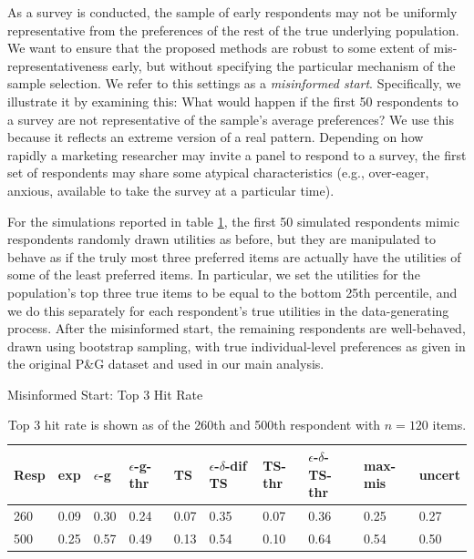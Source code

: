 \documentclass[nonblindrev]{informs3}
\newcommand{\fixedexpressS}{\textbf{exp}}
\newcommand{\egreedyS}{$\epsilon$-\textbf{g}}
\newcommand{\egreedythresS}{$\epsilon$-\textbf{g-thr}}
\newcommand{\misminS}{\textbf{max-mis}}
\newcommand{\tsS}{\textbf{TS} }
\newcommand{\edtsS}{$\epsilon$-$\delta$-\textbf{dif TS} }
\newcommand{\tsthresS}{\textbf{TS-thr} }
\newcommand{\edtsthresS}{$\epsilon$-$\delta$-\textbf{TS-thr} }
\newcommand{\uncertS}{\textbf{uncert} }
\newcommand{\numitems}{n}
\begin{document}
As a survey is conducted, the sample of early respondents may not be uniformly representative from the preferences of the rest of the true underlying population. We want to ensure that the proposed methods are robust to some extent of mis-representativeness early, but without specifying the particular mechanism of the sample selection. We refer to this settings as a \emph{misinformed start}. Specifically, we illustrate it by examining this: What would happen if the first 50 respondents to a survey are not representative of the sample's average preferences? We use this because it reflects an extreme version of a real pattern. Depending on how rapidly a marketing researcher may invite a panel to respond to a survey, the first set of respondents may share some atypical characteristics (e.g., over-eager, anxious, available to take the survey at a particular time).

For the simulations reported in table \ref{table:120mis}, the first 50 simulated respondents mimic respondents randomly drawn utilities as before, but they are manipulated to behave as if the truly most three preferred items are actually have the utilities of some of the least preferred items. In particular, we set the utilities for the population's top three true items to be equal to the bottom 25th percentile, and we do this separately for each respondent's true utilities in the data-generating process. After the misinformed start, the remaining respondents are well-behaved, drawn using bootstrap sampling, with true individual-level preferences as given in the original P\&G dataset and used in our main analysis.

\begin{table}
\caption{Misinformed Start: Top 3 Hit Rate}
\begin{tabular}{llllllllll}
\hline   Resp &  \fixedexpressS&\egreedyS&\egreedythresS&\tsS&\edtsS&\tsthresS&\edtsthresS& \misminS& \uncertS   \\ \hline    260 &   0.09 &   0.30 & 0.24 & 0.07  & 0.35 & 0.07 &  0.36 & 0.25 &   0.27 \\
  500 &  0.25 &   0.57 &  0.49 &  0.13 & 0.54 &   0.10 &    0.64 & 0.54 &  0.50  \end{tabular}
\begin{center}
\caption{Top 3 hit rate is shown as of the 260th and 500th respondent with $\numitems=120$ items.} \label{table:120mis} 
\end{center}
\end{table}
\end{document}
